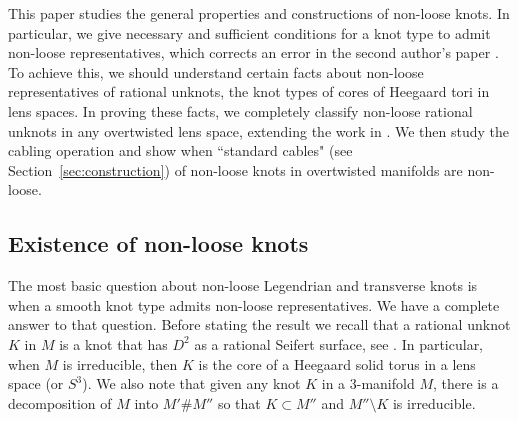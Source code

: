 \documentclass[11pt]{amsart}
\theoremstyle{plain}
\theoremstyle{definition}
\theoremstyle{remark}
\numberwithin{theorem}{section}
\begin{document}
This paper studies the general properties and constructions of non-loose knots. In particular, we give necessary and sufficient conditions for a knot type to admit non-loose representatives, which corrects an error in the second author's paper \cite{Etnyre13}. To achieve this, we should understand certain facts about non-loose representatives of rational unknots, the knot types of cores of Heegaard tori in lens spaces. In proving these facts, we completely classify non-loose rational unknots in any overtwisted lens space, extending the work in \cite{GeigesOnaran15}. We then study the cabling operation and show when ``standard cables" (see Section~\ref{sec:construction}) of non-loose knots in overtwisted manifolds are non-loose. 

\subsection{Existence of non-loose knots}\label{sec:existence}

The most basic question about non-loose Legendrian and transverse knots is when a smooth knot type admits non-loose representatives. We have a complete answer to that question.  Before stating the result we recall that a rational unknot $K$ in $M$ is a knot that has $D^2$ as a rational Seifert surface, see \cite{BakerEtnyre12}. In particular, when $M$ is irreducible, then $K$ is the core of a Heegaard solid torus in a lens space (or $S^3$).  We also note that given any knot $K$ in a $3$-manifold $M$, there is a decomposition of $M$ into $M'\#M''$ so that $K\subset M''$ and $M''\setminus K$ is irreducible. 
\end{document}
